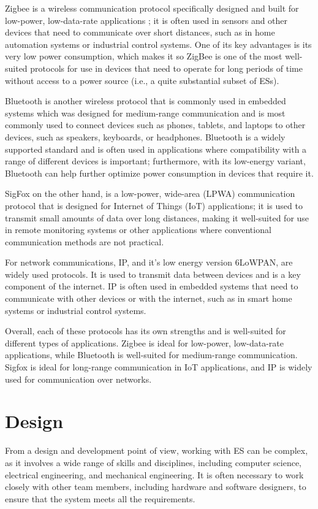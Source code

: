 Zigbee is a wireless communication protocol specifically designed and built for low-power, low-data-rate applications \cite{Zigbee}; it is often used in sensors and other devices that need to communicate over short distances, such as in home automation systems or industrial control systems. One of its key advantages is its very low power consumption, which makes it so ZigBee is one of the most well-suited protocols for use in devices that need to operate for long periods of time without access to a power source (i.e., a quite substantial subset of ESs).

Bluetooth is another wireless protocol that is commonly used in embedded systems which was designed for medium-range communication and is most commonly used to connect devices such as phones, tablets, and laptops to other devices, such as speakers, keyboards, or headphones. Bluetooth is a widely supported standard and is often used in applications where compatibility with a range of different devices is important; furthermore, with its low-energy variant, Bluetooth can help further optimize power consumption in devices that require it.

SigFox on the other hand, is a low-power, wide-area (LPWA) communication protocol that is designed for Internet of Things (IoT) applications; it is used to transmit small amounts of data over long distances, making it well-suited for use in remote monitoring systems or other applications where conventional communication methods are not practical.

For network communications, IP, and it's low energy version 6LoWPAN, are widely used protocols. It is used to transmit data between devices and is a key component of the internet. IP is often used in embedded systems that need to communicate with other devices or with the internet, such as in smart home systems or industrial control systems.

Overall, each of these protocols has its own strengths and is well-suited for different types of applications. Zigbee is ideal for low-power, low-data-rate applications, while Bluetooth is well-suited for medium-range communication. Sigfox is ideal for long-range communication in IoT applications, and IP is widely used for communication over networks.



\section{Design}
From a design and development point of view, working with ES can be complex, as it involves a wide range of skills and disciplines, including computer science, electrical engineering, and mechanical engineering. It is often necessary to work closely with other team members, including hardware and software designers, to ensure that the system meets all the requirements.

